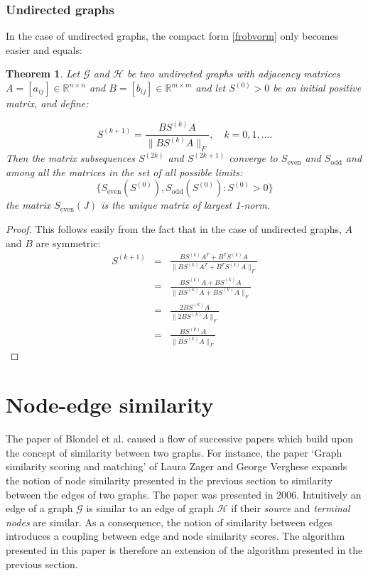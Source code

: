 \documentclass[a4paper,11pt]{report}
\newtheorem{theorem}{Theorem}[section]
\newcommand{\R}{{\mathbb R}}
\newcommand{\graf}{\mathscr{G}}
\newcommand{\grafeen}{\mathscr{H}}
\begin{document}
\subsubsection{Undirected graphs}
In the case of undirected graphs, the compact form \ref{frobvorm} only 
becomes easier and equals:
\begin{theorem}
    Let $\graf$ and $\grafeen$ be two undirected graphs with adjacency matrices $A = [a_{ij}] \in \R^{n\times n}$ 
  and $B = [b_{ij}] \in \R^{m\times m}$ and let $S^{(0)} > 0$ be an initial positive matrix, and 
  define:

  $$S^{(k+1)} = \frac{BS^{(k)}A}{\|BS^{(k)}A\|_F}, \quad k = 
  0,1,\ldots.$$
  Then the matrix subsequences $S^{(2k)}$ and $S^{(2k+1)}$ converge to $S_\text{even}$ 
  and $S_\text{odd}$ and among all the matrices in the set of all possible 
  limits:
  $$\{S_\text{even}(S^{(0)}), S_\text{odd}(S^{(0)}): S^{(0)} > 0 \}$$
  the matrix $S_\text{even}(J)$ is the unique matrix of largest 
  1-norm.

\end{theorem}
\begin{proof}
  This follows easily from the fact that in the case of undirected graphs, $A$ 
  and $B$ are symmetric:
  \begin{eqnarray*}
     S^{(k+1)} &=& \frac{BS^{(k)}A^T + B^TS^{(k)}A}{\|BS^{(k)}A^T + 
     B^TS^{(k)}A\|_F}\\
     &=& \frac{BS^{(k)}A + BS^{(k)}A}{\|BS^{(k)}A + BS^{(k)}A\|_F}\\
     &=& \frac{2BS^{(k)}A}{\|2BS^{(k)}A\|_F}\\
     &=& \frac{BS^{(k)}A}{\|BS^{(k)}A\|_F}
\end{eqnarray*}
  
\end{proof}
\newpage
\section{Node-edge similarity}
The paper of Blondel et al. \cite{blondel} caused a flow of successive papers 
which build upon the concept of similarity between two graphs. For instance, the paper
`Graph similarity scoring and 
matching' of Laura Zager and George Verghese \cite{zager} expands the 
notion of node similarity presented in the previous section to similarity 
between the edges of two graphs. The paper was presented in 2006. Intuitively an 
edge of a graph $\graf$ is similar to an edge of graph $\grafeen$ if their 
\emph{source} and \emph{terminal nodes} are similar. As a consequence, the notion of similarity between edges
introduces a coupling between edge and node similarity scores. The algorithm presented in 
this paper is therefore an extension of the algorithm presented in the previous section.
\end{document}
